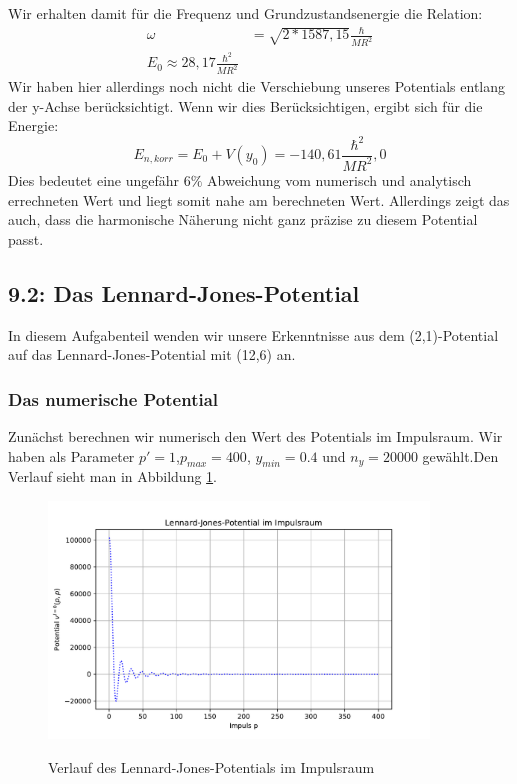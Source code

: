 \documentclass[11pt,a4paper]{article}
\begin{document}
Wir erhalten damit für die Frequenz und Grundzustandsenergie die Relation:
\begin{align*}
	\omega &= \sqrt{2*1587,15}\frac{\hbar}{MR^2} \\
	E_0 \approx 28,17 \frac{\hbar^2}{MR^2}
\end{align*}
Wir haben hier allerdings noch nicht die Verschiebung unseres Potentials entlang der y-Achse berücksichtigt. Wenn wir dies Berücksichtigen, ergibt sich für die Energie:
\begin{equation}
	E_{n,korr} = E_0 + V(y_0) = -140,61\frac{\hbar^2}{MR^2},0
\end{equation}
Dies bedeutet eine ungefähr $6\%$ Abweichung vom numerisch und analytisch errechneten Wert und liegt somit nahe am berechneten Wert. Allerdings zeigt das auch, dass die harmonische Näherung nicht ganz präzise zu diesem Potential passt.
\subsection*{9.2: Das Lennard-Jones-Potential}
In diesem Aufgabenteil wenden wir unsere Erkenntnisse aus dem (2,1)-Potential auf das Lennard-Jones-Potential mit (12,6) an.
\subsubsection*{Das numerische Potential}
 Zunächst berechnen wir numerisch den Wert des Potentials im Impulsraum. Wir haben als Parameter $p'=1$,$p_{max}=400$, $y_{min}=0.4$ und $n_y = 20000$ gewählt.Den Verlauf sieht man in Abbildung \ref{fig:lennard_jones_pot}.
\begin{figure}[htbp]
	\includegraphics[width=0.9\textwidth]{lennard_jones_pot.pdf}\label{fig:lennard_jones_pot}
	\caption{Verlauf des Lennard-Jones-Potentials im Impulsraum}
\end{figure}
\end{document}
